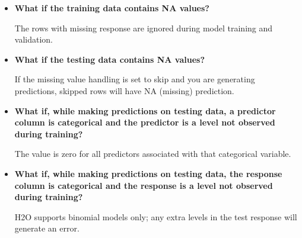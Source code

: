 \begin{itemize}
\item \textbf{What if the training data contains NA values?}

 The rows with missing response are ignored during model training and validation.

\item \textbf{What if the testing data contains NA values?}

 If the missing value handling is set to skip and you are generating predictions, skipped rows will have NA (missing) prediction.

\item \textbf{What if, while making predictions on testing data, a predictor column is categorical and the predictor is a level not observed during training?}

 The value is zero for all predictors associated with that categorical variable.

\item \textbf{What if, while making predictions on testing data, the response column is categorical and the response is a level not observed during training?} 

H2O supports binomial models only; any extra levels in the test response will generate an error.
\end{itemize}

